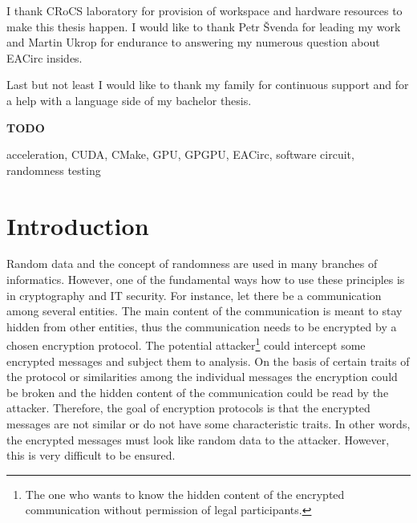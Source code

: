 \documentclass[12pt,oneside]{fithesis2}
\newcommand{\todo}{
	\noindent
	{\large\color{red}\textbf{TODO}}
}
\begin{document}
\FrontMatter
	\ThesisTitlePage
	\begin{ThesisDeclaration}
		\DeclarationText
		\AdvisorName
	\end{ThesisDeclaration}
	\begin{ThesisThanks}
		I thank CRoCS laboratory for provision of workspace and hardware resources to make this thesis happen. I would like to thank Petr Švenda for leading my work and Martin Ukrop for endurance to answering my numerous question about EACirc insides.
		
		\bigskip
		
		\noindent
		Last but not least I would like to thank my family for continuous support and for a help with a language side of my bachelor thesis.
	\end{ThesisThanks}
	\begin{ThesisAbstract}
		\todo{}
	\end{ThesisAbstract}
	\begin{ThesisKeyWords}
		acceleration, CUDA, CMake, GPU, GPGPU, EACirc, software circuit, randomness testing
	\end{ThesisKeyWords}
	\tableofcontents

\MainMatter
\chapter{Introduction}
Random data and the concept of randomness are used in many branches of informatics. However, one of the fundamental ways how to use these principles is in cryptography and IT security. For instance, let there be a communication among several entities. The main content of the communication is meant to stay hidden from other entities, thus the communication needs to be encrypted by a chosen encryption protocol. The potential attacker\footnote{The one who wants to know the hidden content of the encrypted communication without permission of legal participants.} could intercept some encrypted messages and subject them to analysis. On the basis of certain traits of the protocol or similarities among the individual messages the encryption could be broken and the hidden content of the communication could be read by the attacker. Therefore, the goal of encryption protocols is that the encrypted messages are not similar or do not have some characteristic traits. In other words, the encrypted messages must look like random data to the attacker. However, this is very difficult to be ensured.
\end{document}
